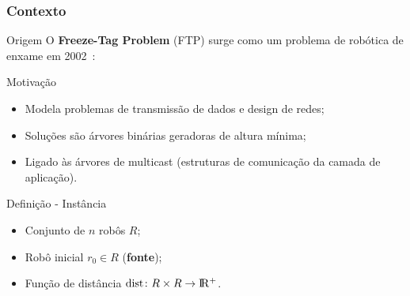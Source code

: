 
\subsubsection{Contexto}

\stopcounter
\begin{frame}{Origem}
  O \textbf{Freeze-Tag Problem} (FTP) surge como um problema de robótica de enxame em 2002~\cite{Arkin02}:
  \bigbreak
  \begin{minipage}{\linewidth}
    \centering
  \end{minipage}
\end{frame}
\inccounter

\begin{frame}{Motivação}
  \begin{itemize}[<+->]

    \item Modela problemas de transmissão de dados e design de redes;

    \item Soluções são árvores binárias geradoras de altura mínima;

    \item Ligado às árvores de multicast (estruturas de comunicação da camada de aplicação).

  \end{itemize}
\end{frame}

\begin{frame}{Definição - Instância}
  \begin{itemize}[<+->]

    \item Conjunto de $n$ robôs $R$;

    \item Robô inicial $r_0 \in R$ (\textbf{fonte});

    \item Função de distância $\text{dist}\colon R\times R \to \rm I\!R^+$.

  \end{itemize}
\end{frame}

